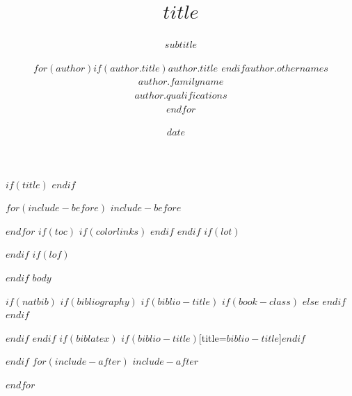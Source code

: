 \documentclass[$if(fontsize)$$fontsize$$else$11pt$endif$,$if(lang)$$babel-lang$,$endif$a4paper,$for(classoption)$$classoption$$sep$,$endfor$]{$documentclass$}
\title{$title$}
\subtitle{$subtitle$}
\institute{$for(institute)$$institute$$sep$ \and $endfor$}
\author{\sf$for(author)${\Large\textbf{$if(author.title)$$author.title$ $endif$$author.othernames$ $author.familyname$}\\\large $author.qualifications$\\[0.5cm]}$endfor$}
\date{$date$}
\date{\sf\Date~\Month~\Year}
\makeatletter
\def\titlepage{\front{\expandafter{\@title}}{\@author}{\@organization}}
\makeatother
\begin{document}
$if(title)$
\titlepage
$endif$

$for(include-before)$
$include-before$

$endfor$
$if(toc)$
{
$if(colorlinks)$
\hypersetup{linkcolor=$if(toccolor)$$toccolor$$else$black$endif$}
$endif$
\setcounter{tocdepth}{$toc-depth$}
\tableofcontents
}
$endif$
$if(lot)$
\listoftables
$endif$
$if(lof)$
\listoffigures
$endif$
$body$

$if(natbib)$
$if(bibliography)$
$if(biblio-title)$
$if(book-class)$
\renewcommand\bibname{$biblio-title$}
$else$
\renewcommand\refname{$biblio-title$}
$endif$
$endif$


$endif$
$endif$
$if(biblatex)$
\printbibliography$if(biblio-title)$[title=$biblio-title$]$endif$

$endif$
$for(include-after)$
$include-after$

$endfor$
\end{document}
